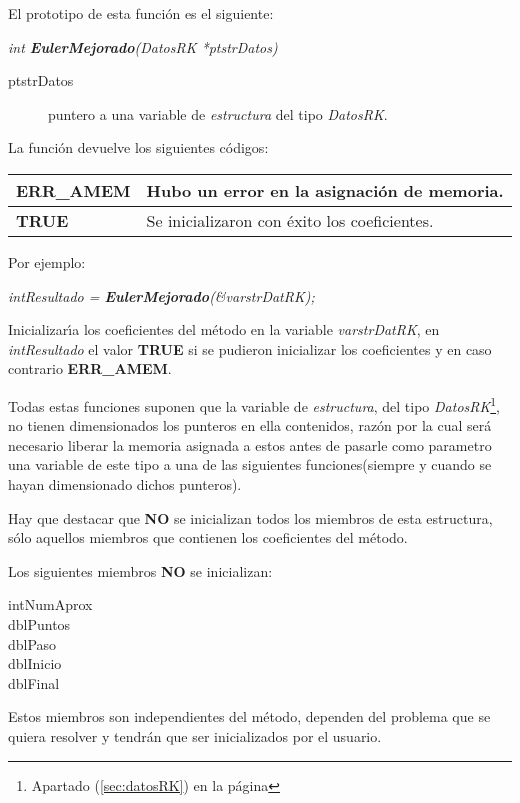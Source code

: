 El prototipo de esta funci\'on es el siguiente:

\begin{center}
\emph{int \textbf{EulerMejorado}(DatosRK *ptstrDatos)}
\end{center}

\begin{description}
\item[ptstrDatos] puntero a una variable de \emph{estructura} del tipo
\emph{DatosRK}.
\end{description}

La funci\'on devuelve los siguientes c\'odigos:

\begin{center}
\begin{tabular}{|l|l|}
\hline
\textbf{ERR\_AMEM} & Hubo un error en la asignaci\'on de memoria. \\
\hline
\textbf{TRUE} & Se inicializaron con \'exito los coeficientes. \\
\hline
\end{tabular}
\end{center}

Por ejemplo:

\begin{center}
\emph{intResultado = \textbf{EulerMejorado}(\&varstrDatRK);}
\end{center}


Inicializar\'{\i}a los coeficientes del m\'etodo en la variable
\emph{varstrDatRK}, en \emph{intResultado} el valor \textbf{TRUE} si se pudieron
inicializar los coeficientes y en caso contrario \textbf{ERR\_AMEM}.





Todas estas funciones suponen que la variable de \emph{estructura}, del tipo
\emph{DatosRK}\footnote{Apartado (\ref{sec:datosRK}) en la p\'agina 
\pageref{sec:datosRK}}, no tienen dimensionados los punteros en ella 
contenidos, raz\'on por la cual ser\'a necesario liberar la memoria asignada
a estos antes de pasarle como parametro una variable de este tipo a una de
las siguientes funciones(siempre y cuando se hayan dimensionado dichos
punteros).\newline

Hay que destacar que \textbf{NO} se inicializan todos los miembros de esta
estructura, s\'olo aquellos miembros que contienen los coeficientes del 
m\'etodo.\newline

Los siguientes miembros \textbf{NO} se inicializan:
%
\begin{description}
\item[intNumAprox]
\item[dblPuntos]
\item[dblPaso]
\item[dblInicio]
\item[dblFinal]
\end{description}

Estos miembros son independientes del m\'etodo, dependen del problema que
se quiera resolver y tendr\'an que ser inicializados por el usuario.

